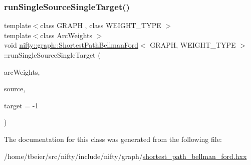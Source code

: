 \mbox{\label{classnifty_1_1graph_1_1ShortestPathBellmanFord_a0b0ac675dcade4a09ac4c54a55ffb322}} 
\subsubsection{\texorpdfstring{run\+Single\+Source\+Single\+Target()}{runSingleSourceSingleTarget()}}
{\footnotesize\ttfamily template$<$class G\+R\+A\+PH , class W\+E\+I\+G\+H\+T\+\_\+\+T\+Y\+PE $>$ \\
template$<$class Arc\+Weights $>$ \\
void \hyperlink{classnifty_1_1graph_1_1ShortestPathBellmanFord}{nifty\+::graph\+::\+Shortest\+Path\+Bellman\+Ford}$<$ G\+R\+A\+PH, W\+E\+I\+G\+H\+T\+\_\+\+T\+Y\+PE $>$\+::run\+Single\+Source\+Single\+Target (\begin{DoxyParamCaption}\item[{Arc\+Weights}]{arc\+Weights,  }\item[{const int64\+\_\+t}]{source,  }\item[{const int64\+\_\+t}]{target = {\ttfamily -\/1} }\end{DoxyParamCaption})\hspace{0.3cm}{\ttfamily [inline]}}



The documentation for this class was generated from the following file\+:\begin{DoxyCompactItemize}
\item 
/home/tbeier/src/nifty/include/nifty/graph/\hyperlink{shortest__path__bellman__ford_8hxx}{shortest\+\_\+path\+\_\+bellman\+\_\+ford.\+hxx}\end{DoxyCompactItemize}
